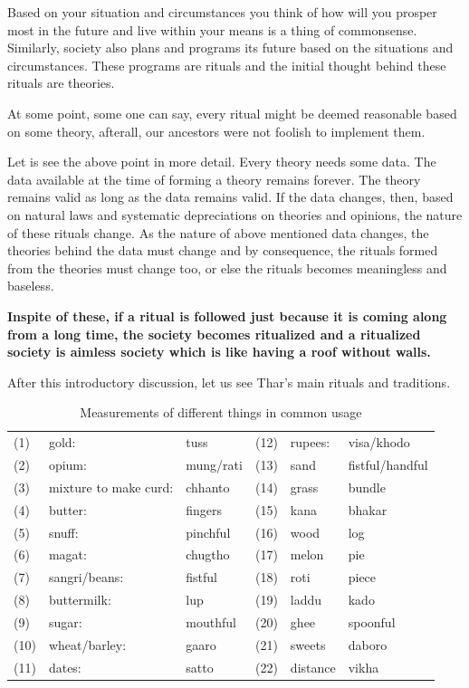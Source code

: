 Based on your situation and circumstances you think of how will you prosper most
in the future and live within your means is a thing of commonsense. Similarly,
society also plans and programs its future based on the situations and
circumstances. These programs are rituals and the initial thought behind these
rituals are theories.

At some point, some one can say, every ritual might be deemed reasonable based
on some theory, afterall, our ancestors were not foolish to implement them.

Let is see the above point in more detail. Every theory needs some data. The
data available at the time of forming a theory remains forever. The theory
remains valid as long as the data remains valid. If the data changes, then,
based on natural laws and systematic depreciations on theories and opinions, the
nature of these rituals change. As the nature of above mentioned data changes,
the theories behind the data must change and by consequence, the rituals formed
from  the theories must change too, or else the rituals becomes meaningless and
baseless.

\textbf{Inspite of these, if a ritual is followed just because it is coming along from a
long time, the society becomes ritualized and a ritualized society is aimless
society which is like having a roof without walls.}

After this introductory discussion, let us see Thar's main rituals and
traditions.

\begin{table}
\begin{center}
\begin{tabular}{|lll|lll|}
\hline
(1) & gold: & tuss & (12) & rupees: & visa/khodo\\
(2) & opium: & mung/rati & (13)  &sand  & fistful/handful\\
(3) &mixture to make curd: & chhanto & (14)  &grass  &bundle\\
(4) &butter: & fingers & (15) &kana  &bhakar\\
(5) &snuff: &pinchful & (16) &wood  &log\\
(6) &magat: &chugtho & (17) &melon  & pie\\
(7) &sangri/beans: &fistful & (18) &roti  & piece\\
(8) &buttermilk: &lup & (19) &laddu  &kado\\
(9) &sugar: &mouthful & (20) &ghee  & spoonful\\
(10)&wheat/barley: &gaaro & (21) &sweets  & daboro\\
(11)&dates: &satto & (22) &distance  & vikha\\
\hline
\end{tabular}
\end{center}
\caption{Measurements of different things in common usage}
\label{tbl:measure}
\end{table}

